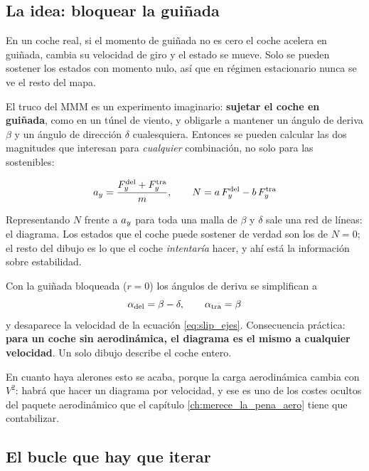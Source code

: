 \subsection{La idea: bloquear la guiñada}

En un coche real, si el momento de guiñada no es cero el coche acelera en
guiñada, cambia su velocidad de giro y el estado se mueve. Solo se pueden
sostener los estados con momento nulo, así que en régimen estacionario nunca se
ve el resto del mapa.

El truco del MMM es un experimento imaginario: \textbf{sujetar el coche en
guiñada}, como en un túnel de viento, y obligarle a mantener un ángulo de
deriva $\beta$ y un ángulo de dirección $\delta$ cualesquiera. Entonces se
pueden calcular las dos magnitudes que interesan para \emph{cualquier}
combinación, no solo para las sostenibles:

\begin{equation}
  a_y = \frac{F_y^{\text{del}} + F_y^{\text{tra}}}{m},
  \qquad
  N = a\,F_y^{\text{del}} - b\,F_y^{\text{tra}}
  \label{eq:ymd_ay_n}
\end{equation}

Representando $N$ frente a $a_y$ para toda una malla de $\beta$ y $\delta$ sale
una red de líneas: el diagrama. Los estados que el coche puede sostener de
verdad son los de $N = 0$; el resto del dibujo es lo que el coche
\emph{intentaría} hacer, y ahí está la información sobre estabilidad.

\begin{clave}
Con la guiñada bloqueada ($r = 0$) los ángulos de deriva se simplifican a
\begin{equation*}
  \alpha_{\text{del}} = \beta - \delta,
  \qquad
  \alpha_{\text{tra}} = \beta
\end{equation*}
y desaparece la velocidad de la ecuación \eqref{eq:slip_ejes}. Consecuencia
práctica: \textbf{para un coche sin aerodinámica, el diagrama es el mismo a
cualquier velocidad}. Un solo dibujo describe el coche entero.

En cuanto haya alerones esto se acaba, porque la carga aerodinámica cambia con
$V^2$: habrá que hacer un diagrama por velocidad, y ese es uno de los costes
ocultos del paquete aerodinámico que el capítulo
\ref{ch:merece_la_pena_aero} tiene que contabilizar.
\end{clave}

\subsection{El bucle que hay que iterar}

